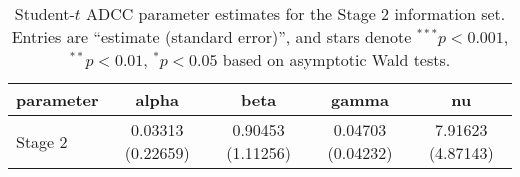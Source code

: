 \begin{table}
\caption{Student-$t$ ADCC parameter estimates for the Stage 2 information set.  Entries are “estimate (standard error)”, and stars denote $^{***}p<0.001$, $^{**}p<0.01$, $^{*}p<0.05$ based on asymptotic Wald tests.}
\label{tab:adcc_stage2_coeffs}
\begin{tabular}{lcccc}
\toprule
parameter & alpha & beta & gamma & nu \\
\midrule
Stage 2 & 0.03313 (0.22659) & 0.90453 (1.11256) & 0.04703 (0.04232) & 7.91623 (4.87143) \\
\bottomrule
\end{tabular}
\end{table}
